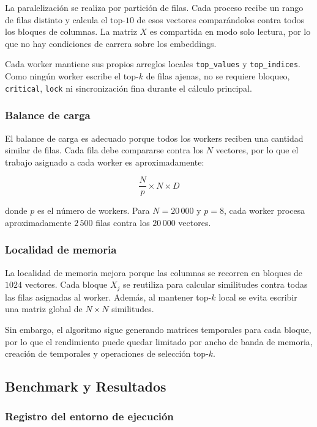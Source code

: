 \documentclass[10pt,a4paper]{article}
\begin{document}
La paralelizaci\'on se realiza por partici\'on de filas. Cada proceso recibe un
rango de filas distinto y calcula el top-$10$ de esos vectores compar\'andolos
contra todos los bloques de columnas. La matriz $X$ es compartida en modo solo
lectura, por lo que no hay condiciones de carrera sobre los embeddings.

Cada worker mantiene sus propios arreglos locales \texttt{top\_values} y
\texttt{top\_indices}. Como ning\'un worker escribe el top-$k$ de filas ajenas,
no se requiere bloqueo, \texttt{critical}, \texttt{lock} ni sincronizaci\'on fina
durante el c\'alculo principal.

\subsubsection{Balance de carga}

El balance de carga es adecuado porque todos los workers reciben una cantidad
similar de filas. Cada fila debe compararse contra los $N$ vectores, por lo que
el trabajo asignado a cada worker es aproximadamente:

\[
\frac{N}{p} \times N \times D
\]

donde $p$ es el n\'umero de workers. Para $N=20\,000$ y $p=8$, cada worker
procesa aproximadamente $2\,500$ filas contra los $20\,000$ vectores.

\subsubsection{Localidad de memoria}

La localidad de memoria mejora porque las columnas se recorren en bloques de
$1024$ vectores. Cada bloque $X_j$ se reutiliza para calcular similitudes contra
todas las filas asignadas al worker. Adem\'as, al mantener top-$k$ local se
evita escribir una matriz global de $N \times N$ similitudes.

Sin embargo, el algoritmo sigue generando matrices temporales para cada bloque,
por lo que el rendimiento puede quedar limitado por ancho de banda de memoria,
creaci\'on de temporales y operaciones de selecci\'on top-$k$.

\subsection{Benchmark y Resultados}

\subsubsection{Registro del entorno de ejecuci\'on}
\end{document}

